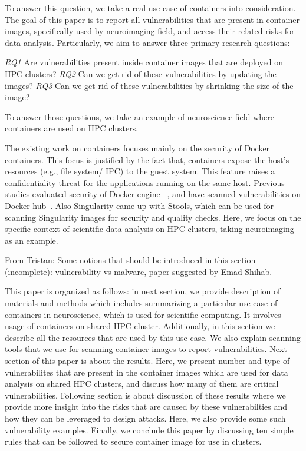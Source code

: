\documentclass[a4paper,num-refs]{oup-contemporary}
\newcommand{\TG}[1]{\color{blue}From Tristan: #1 \color{black}}
\begin{document}
To answer this question, we take a real use case of containers into consideration.
The goal of this paper is to report all vulnerabilities that are present in
container images, specifically used by neuroimaging field, and access their
related risks for data analysis. Particularly, we aim to answer three primary
research questions:

\textit{RQ1} Are vulnerabilities present inside container images that are
deployed on HPC clusters?
\textit{RQ2} Can we get rid of these vulnerabilities by updating the
images?
\textit{RQ3} Can we get rid of these vulnerabilities by shrinking the
size of the image?

To answer those questions, we take an example of neuroscience field where
containers are used on HPC clusters.

The existing work on containers focuses mainly on the security of Docker
containers.
This focus is justified by the fact that, containers expose the host's resources
(e.g., file system/ IPC) to the guest system. This feature raises a confidentiality
threat for the applications running on the same host. Previous studies evaluated
security of Docker engine ~\cite{martin2018docker, sultan2019container, combe2016docker, bui2015analysis},
and have scanned vulnerabilities on Docker hub~\cite{Shu2017, gummaraju2015over}.
Also Singularity came up with Stools, which can be used for scanning Singularity images
for security and quality checks.
Here, we focus on the specific context of scientific data analysis on HPC clusters, taking
neuroimaging as an example.

\TG{Some notions that should be introduced in this section (incomplete):
vulnerability vs malware, paper suggested by Emad Shihab.}

This paper is organized as follows: in next section, we provide description
of materials and methods which includes summarizing a particular use case of
containers in neuroscience, which is used for scientific computing. It involves
usage of containers on shared HPC cluster. Additionally, in this section we
describe all the resources that are used by this use case. We also explain
scanning tools that we use for scanning container images to report
vulnerabilities. Next section of this paper is about the results. Here, we
present number and type of vulnerabilites that are present in the container images
which are used for data analysis on shared HPC clusters, and discuss how many of them are
critical vulnerabilities. Following section is about discussion of these results
where we provide more insight into the risks that are caused by these vulnerabilties
and how they can be leveraged to design attacks. Here, we also provide some such
vulnerability examples. Finally, we conclude this paper by discussing ten simple
rules that can be followed to secure container image for use in clusters.
\end{document}

